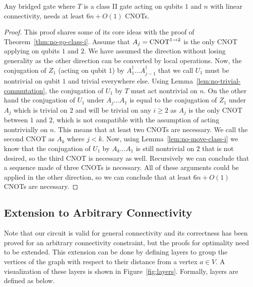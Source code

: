 \begin{theorem}\label{thm:no-go-class-ii}
  Any bridged gate where $T$ is a class II gate acting on qubits $1$ and $n$ with linear connectivity, needs at least $6n + O(1)$ CNOTs.
\end{theorem}
\begin{proof}
  This proof shares some of its core ideas with the proof of Theorem~\ref{thm:no-go-class-i}.
  Assume that $A_j = \operatorname{CNOT}^{1 \to 2}$ is the only CNOT applying on qubits $1$ and $2$. We have assumed the direction without losing generality as the other direction can be converted by local operations. Now, the conjugation of $Z_1$ (acting on qubit $1$) by $A^\dagger_1 \dots A^\dagger_{j-1}$ that we call $U_1$ must be nontrivial on qubit $1$ and trivial everywhere else. Using Lemma~\ref{lem:no-trivial-commutation}, the conjugation of $U_1$ by $T$ must act nontrivial on $n$. On the other hand the conjugation of $U_1$ under $A_j\dots A_1$ is equal to the conjugation of $Z_1$ under $A_j$ which is trivial on $2$ and will be trivial on any $i \ge 2$ as $A_j$ is the only CNOT between $1$ and $2$, which is not compatible with the assumption of acting nontrivially on $n$. This means that at least two CNOTs are necessary. We call the second CNOT as $A_k$ where $j < k$. Now, using Lemma~\ref{lem:no-move-class-i} we know that the conjugation of $U_1$ by $A_k\dots A_1$ is still nontrivial on $2$ that is not desired, so the third CNOT is necessary as well. Recursively we can conclude that a sequence made of three CNOTs is necessary. All of these arguments could be applied in the other direction, so we can conclude that at least $6n + O(1)$ CNOTs are necessary.
\end{proof}
\subsection{Extension to Arbitrary Connectivity}

Note that our circuit is valid for general connectivity and its correctness has been proved for an arbitrary connectivity constraint, but the proofs for optimality need to be extended. This extension can be done by defining layers to group the vertices of the graph with respect to their distance from a vertex $a \in V$. A visualization of these layers is shown in Figure~\ref{fig:layers}. Formally, layers are defined as below.

